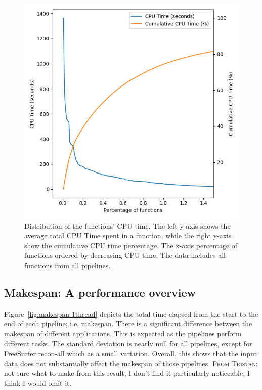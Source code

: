 \documentclass[conference]{IEEEtran}
\newcommand{\TG}[1]{\color{blue}\textsc{From Tristan: }#1\color{black}}
\begin{document}
\begin{figure}[h]
	\centering
	\includegraphics[width=\linewidth]{figures/global-longtail.png}
	\caption{Distribution of the functions' CPU time. The left y-axis shows the average total CPU Time spent in a function, while the right y-axis show the cumulative CPU time percentage. The x-axis percentage of functions ordered by decreasing CPU time. The data includes all functions from all pipelines. }
	\label{fig:long-tail-distribution}
\end{figure}
				
\subsection{Makespan: A performance overview}
Figure~\ref{fig:makespan-1thread} depicts the total time elapsed from the start to the end of each pipeline; i.e. makespan. There is a significant difference between the makespan of different applications. This is expected as the pipelines perform different tasks. The standard deviation is nearly null for all pipelines, except for FreeSurfer recon-all which as a small variation. Overall, this shows that the input data does not substantially affect the makespan of those pipelines. \TG{not sure what to make from this result, I don't find it particularly noticeable, I think I would omit it.}
			
\end{document}
